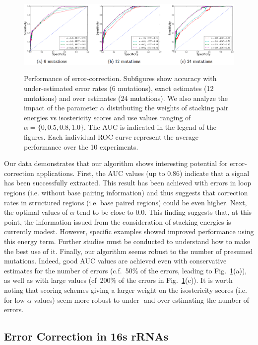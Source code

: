 \begin{figure}
\centering
	\includegraphics[width=\textwidth]{subfigs_perform.png}\\

\caption{Performance of error-correction. Subfigures show accuracy with under-estimated error rates (6 mutations), exact estimates (12 mutations) and over estimates 
(24 mutations). We also analyze the impact of the parameter $\alpha$ distributing the weights of stacking pair energies vs isostericity scores and use values 
ranging of $\alpha=\{0,0.5,0.8,1.0\}$. The AUC is indicated in the legend of the figures. Each individual ROC curve represent the average performance over the 10 experiments.}
\label{fig:ROCall}\SpaceCheating
\end{figure}

Our data demonstrates that our algorithm shows interesting potential for error-correction applications. First, the AUC values (up to $0.86$) indicate that a
signal has been successfully extracted. This result has been achieved with errors in loop regions (i.e. without base pairing information) and thus suggests
that correction rates in structured regions (i.e. base paired regions) could be even higher. Next, the optimal values of $\alpha$ tend to be close to $0.0$. This 
finding suggests that, at this point, the information issued from the consideration of stacking energies is currently modest. However, specific examples showed improved performance
using this energy term. Further studies must be conducted to understand how to make the best use of it. Finally, our algorithm seems robust to the number of
presumed mutations. Indeed, good AUC values are achieved even with conservative estimates for the number of errors (c.f.~50\% of the errors, leading to 
Fig.~\ref{fig:ROCall}(a)), as well as with large  values (cf~200\% of the errors  in Fig.~\ref{fig:ROCall}(c)). It is worth noting that scoring schemes giving a larger weight on
the isostericity scores (i.e. for low $\alpha$ values) seem more robust to under- and over-estimating the number of errors.


\subsection{Error Correction in 16s rRNAs}

